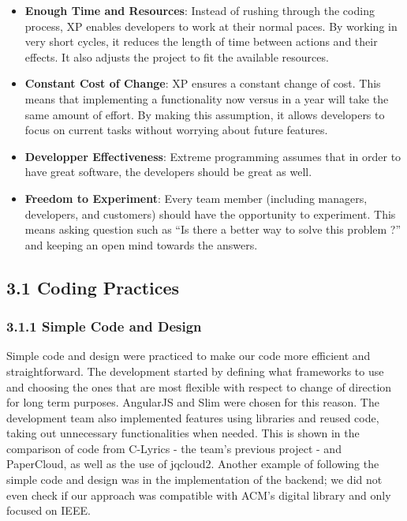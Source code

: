 \documentclass[]{article}
\begin{document}
\begin{itemize}
\itemsep1pt\parskip0pt
\item
  \textbf{Enough Time and Resources}: Instead of rushing through the
  coding process, XP enables developers to work at their normal paces.
  By working in very short cycles, it reduces the length of time between
  actions and their effects. It also adjusts the project to fit the
  available resources.
\item
  \textbf{Constant Cost of Change}: XP ensures a constant change of
  cost. This means that implementing a functionality now versus in a
  year will take the same amount of effort. By making this assumption,
  it allows developers to focus on current tasks without worrying about
  future features.
\item
  \textbf{Developper Effectiveness}: Extreme programming assumes that in
  order to have great software, the developers should be great as well.
\item
  \textbf{Freedom to Experiment}: Every team member (including managers,
  developers, and customers) should have the opportunity to experiment.
  This means asking question such as ``Is there a better way to solve
  this problem ?'' and keeping an open mind towards the answers.
\end{itemize}

\subsection{3.1 Coding Practices}\label{coding-practices}

\subsubsection{3.1.1 Simple Code and
Design}\label{simple-code-and-design}

Simple code and design were practiced to make our code more efficient
and straightforward. The development started by defining what frameworks
to use and choosing the ones that are most flexible with respect to
change of direction for long term purposes. AngularJS and Slim were
chosen for this reason. The development team also implemented features
using libraries and reused code, taking out unnecessary functionalities
when needed. This is shown in the comparison of code from C-Lyrics - the
team's previous project - and PaperCloud, as well as the use of
jqcloud2. Another example of following the simple code and design was in
the implementation of the backend; we did not even check if our approach
was compatible with ACM's digital library and only focused on IEEE.
\end{document}
